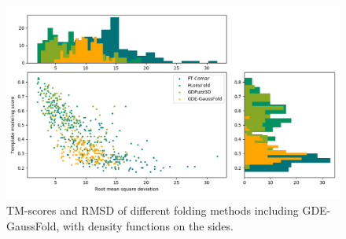     \begin{figure}[H]
      \begin{center}
        \includegraphics[width=\textwidth, keepaspectratio]{imgs/gde.png}
         \caption{TM-scores and RMSD of different folding methods including
         GDE-GaussFold, with density functions on the sides.}
        \label{gde_results}
      \end{center}
    \end{figure}
   